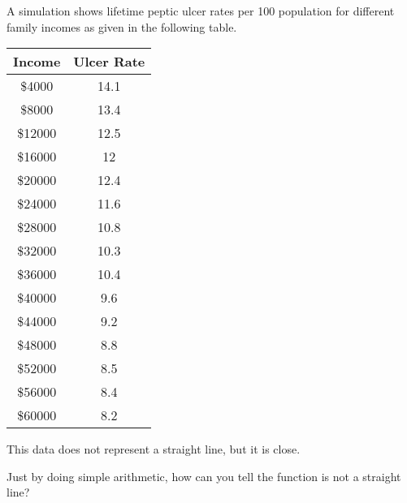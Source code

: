 \begin{activity}\label{A:0.1.3}
A simulation shows lifetime peptic ulcer rates per 100 population for different
family incomes as given in the following table.

\begin{minipage}{0.3\columnwidth}
    \begin{center}
    \begin{tabular}{|c|c|}
        \hline
        Income  & Ulcer Rate\\
        \hline \hline
        \$4000  & 14.1\\
        \$8000  & 13.4\\
        \$12000 &12.5\\
        \$16000 &12\\
        \$20000 &12.4\\
        \$24000 &11.6\\
        \$28000 &10.8\\
        \$32000 &10.3\\
        \$36000 &10.4\\
        \$40000 & 9.6\\
        \$44000 & 9.2\\
        \$48000 & 8.8\\
        \$52000 & 8.5\\
        \$56000 & 8.4\\
        \$60000 & 8.2\\ \hline
    \end{tabular}
\end{center}
\end{minipage}
\begin{minipage}{0.3\columnwidth}
    \begin{center}
    \end{center}
\end{minipage}

This data does not represent a straight line, but it is close.
\ba 
\item Just by doing simple arithmetic, how can you tell the function is not a straight
    line?


\end{activity}

